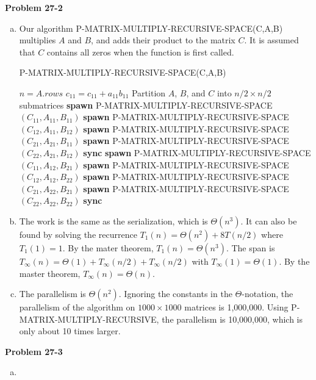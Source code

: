 \documentclass{article}
\begin{document}
\noindent\textbf{Problem 27-2}\\
\begin{enumerate}[a.]
\item Our algorithm P-MATRIX-MULTIPLY-RECURSIVE-SPACE(C,A,B) multiplies $A$ and $B$, and adds their product to the matrix $C$. It is assumed that $C$ contains all zeros when the function is first called.\\

\begin{algorithm}
\caption{P-MATRIX-MULTIPLY-RECURSIVE-SPACE(C,A,B)}
\begin{algorithmic}[1]
\State $n = A.rows$
	\State $c_11 = c_11 + a_11b_11$
\Else
	\State Partition $A$, $B$, and $C$ into $n/2 \times n/2$ submatrices
	\State \textbf{spawn} P-MATRIX-MULTIPLY-RECURSIVE-SPACE$(C_{11}, A_{11}, B_{11})$
	\State \textbf{spawn} P-MATRIX-MULTIPLY-RECURSIVE-SPACE$(C_{12}, A_{11}, B_{12})$
	\State \textbf{spawn} P-MATRIX-MULTIPLY-RECURSIVE-SPACE$(C_{21}, A_{21}, B_{11})$
	\State \textbf{spawn} P-MATRIX-MULTIPLY-RECURSIVE-SPACE$(C_{22}, A_{21}, B_{12})$
	\State \textbf{sync}
	\State \textbf{spawn} P-MATRIX-MULTIPLY-RECURSIVE-SPACE$(C_{11}, A_{12}, B_{21})$
	\State \textbf{spawn} P-MATRIX-MULTIPLY-RECURSIVE-SPACE$(C_{12}, A_{12}, B_{22})$
	\State \textbf{spawn} P-MATRIX-MULTIPLY-RECURSIVE-SPACE$(C_{21}, A_{22}, B_{21})$
	\State \textbf{spawn} P-MATRIX-MULTIPLY-RECURSIVE-SPACE$(C_{22}, A_{22}, B_{22})$
	\State \textbf{sync}
\EndIf
\end{algorithmic}
\end{algorithm}

\item The work is the same as the serialization, which is $\Theta(n^3)$.  It can also be found by solving the recurrence $T_1(n) = \Theta(n^2) + 8T(n/2) $ where $T_1(1) = 1$.  By the mater theorem, $T_1(n) = \Theta(n^3)$.  The span is $T_\infty(n) = \Theta(1) + T_\infty(n/2) + T_\infty(n/2)$ with $T_\infty(1) = \Theta(1)$.  By the master theorem, $T_\infty(n) = \Theta(n)$. \\

\item The parallelism is $\Theta(n^2)$.  Ignoring the constants in the $\Theta$-notation, the parallelism of the algorithm on $1000 \times 1000$ matrices is 1,000,000.  Using P-MATRIX-MULTIPLY-RECURSIVE, the parallelism is 10,000,000, which is only about 10 times larger. \\
\end{enumerate}


\noindent\textbf{Problem 27-3}\\
\begin{enumerate}[a.]
\item
\end{enumerate}
\end{document}
